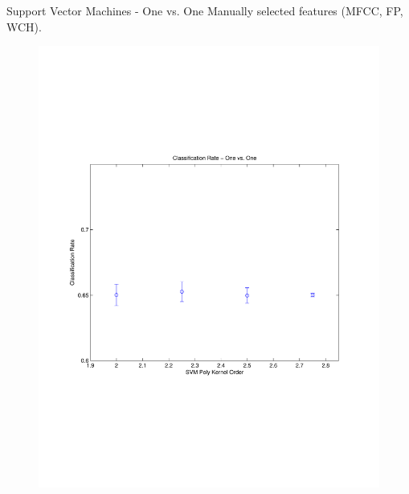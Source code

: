 \documentclass[xcolor=dvipsnames,t]{beamer} %
\begin{document}
\begin{frame}{Support Vector Machines - One vs. One}
   Manually selected features (MFCC, FP, WCH).
   ~\\[-9em]
   \begin{figure}
      \centering
      \includegraphics[width=\textwidth]{figures/optimSVMOVOOrder_WCH.pdf}
   \end{figure}
\end{frame}
\end{document}
